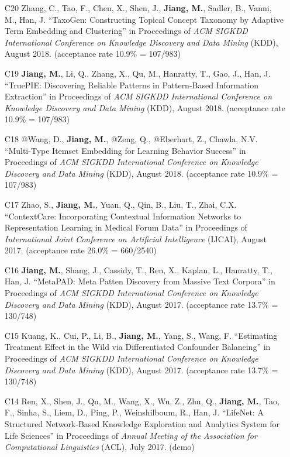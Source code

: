\documentclass[10pt]{article}
\newenvironment{myindentpar}[1]%
{\begin{list}{}%
         {\setlength{\leftmargin}{#1}}%
         \item[]%
}
{\end{list}}
\newcounter{list}
\begin{document}
\begin{myindentpar}{0.00cm}
\begin{enumerate}[leftmargin=.5cm]
\item[C20] Zhang, C., Tao, F., Chen, X., Shen, J., \textbf{Jiang, M.}, Sadler, B., Vanni, M., Han, J. ``TaxoGen: Constructing Topical Concept Taxonomy by Adaptive Term Embedding and Clustering'' in Proceedings of \textit{ACM SIGKDD International Conference on Knowledge Discovery and Data Mining} (KDD), August 2018. (acceptance rate 10.9\% = 107/983)

\item[C19] \textbf{Jiang, M.}, Li, Q., Zhang, X., Qu, M., Hanratty, T., Gao, J., Han, J. ``TruePIE: Discovering Reliable Patterns in Pattern-Based Information Extraction'' in Proceedings of \textit{ACM SIGKDD International Conference on Knowledge Discovery and Data Mining} (KDD), August 2018. (acceptance rate 10.9\% = 107/983)
	
\item[C18] @Wang, D., \textbf{Jiang, M.}, @Zeng, Q., @Eberhart, Z., Chawla, N.V. ``Multi-Type Itemset Embedding for Learning Behavior Success'' in Proceedings of \textit{ACM SIGKDD International Conference on Knowledge Discovery and Data Mining} (KDD), August 2018. (acceptance rate 10.9\% = 107/983)

\item[C17] Zhao, S., \textbf{Jiang, M.}, Yuan, Q., Qin, B., Liu, T., Zhai, C.X. ``ContextCare: Incorporating Contextual Information Networks to Representation Learning in Medical Forum Data'' in Proceedings of \textit{International Joint Conference on Artificial Intelligence} (IJCAI), August 2017. (acceptance rate 26.0\% = 660/2540)

\item[C16] \textbf{Jiang, M.}, Shang, J., Cassidy, T., Ren, X., Kaplan, L., Hanratty, T., Han, J. ``MetaPAD: Meta Patten Discovery from Massive Text Corpora'' in Proceedings of \textit{ACM SIGKDD International Conference on Knowledge Discovery and Data Mining} (KDD), August 2017. (acceptance rate 13.7\% = 130/748)

\item[C15] Kuang, K., Cui, P., Li, B., \textbf{Jiang, M.}, Yang, S., Wang, F. ``Estimating Treatment Effect in the Wild via Differentiated Confounder Balancing'' in Proceedings of \textit{ACM SIGKDD International Conference on Knowledge Discovery and Data Mining} (KDD), August 2017. (acceptance rate 13.7\% = 130/748)

\item[C14] Ren, X., Shen, J., Qu, M., Wang, X., Wu, Z., Zhu, Q., \textbf{Jiang, M.}, Tao, F., Sinha, S., Liem, D., Ping, P., Weinshilboum, R., Han, J. ``LifeNet: A Structured Network-Based Knowledge Exploration and Analytics System for Life Sciences'' in Proceedings of \textit{Annual Meeting of the Association for Computational Linguistics} (ACL), July 2017. (demo)


\end{enumerate}
\end{myindentpar}
\end{document}
